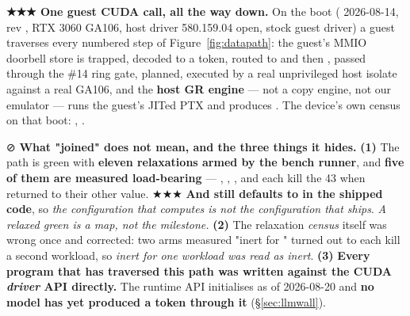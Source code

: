 \documentclass[10.5pt]{article}
\begin{document}
\begin{claimbox}\small
\textbf{★★★ One guest CUDA call, all the way down.} On the  boot (\measured{}
2026-08-14, rev , RTX 3060 GA106, host driver 580.159.04 open, stock guest driver)
a guest  traverses every numbered step of Figure~\ref{fig:datapath}: the
guest's MMIO doorbell store is trapped, decoded to a token, routed to  and
then , passed through the \#14 ring gate, planned, executed by a real
unprivileged host isolate against a real GA106, and the \textbf{host GR engine} — not a copy
engine, not our emulator — runs the guest's JITed PTX and produces . The device's own
census on that boot: , .

\smallskip
⊘ \textbf{What "joined" does not mean, and the three things it hides.} \textbf{(1)} The path is
green with \textbf{eleven relaxations armed by the bench runner}, and \textbf{five of them are
measured load-bearing} — , , ,
 and  each kill the 43 when returned to their other
value. ★★★ \textbf{And  still defaults to  in the shipped
code}, so \emph{the configuration that computes is not the configuration that ships}. \emph{A
relaxed green is a map, not the milestone.} \textbf{(2)} The relaxation \emph{census} itself was
wrong once and corrected: two arms measured "inert for " turned out to each kill a
second workload, so \emph{inert for one workload was read as inert}. \textbf{(3)} \textbf{Every program that
has traversed this path was written against the CUDA \emph{driver} API directly.} The runtime API
initialises as of 2026-08-20 and \textbf{no model has yet produced a token through it}
(\S\ref{sec:llmwall}).
\end{claimbox}
\end{document}
